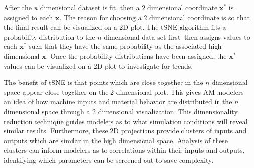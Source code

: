  After the $n$ dimensional dataset is fit, then a 2 dimensional coordinate $\mathbf{x}^*$ is assigned to each $\mathbf{x}$. The reason for choosing a 2 dimensional coordinate is so that the final result can be visualized on a 2D plot. The tSNE algorithm fits a probability distribution to the $n$ dimensional data set first, then assigns values to each $\mathbf{x}^*$ such that they have the same probability as the associated high-dimensional $\mathbf{x}$. Once the probability distributions have been assigned, the $\mathbf{x}^*$ values can be visualized on a 2D plot to investigate for trends.

The benefit of tSNE is that points which are close together in the $n$ dimensional space appear close together on the 2 dimensional plot. This gives AM modelers an idea of how machine inputs and material behavior are distributed in the $n$ dimensional space through a 2 dimensional visualization. This dimensionality reduction technique guides modelers as to what simulation conditions will reveal similar results. Furthermore, these 2D projections provide clusters of inputs and outputs which are similar in the high dimensional space. Analysis of these clusters can inform modelers as to correlations within their inputs and outputs, identifying which parameters can be screened out to save complexity.

